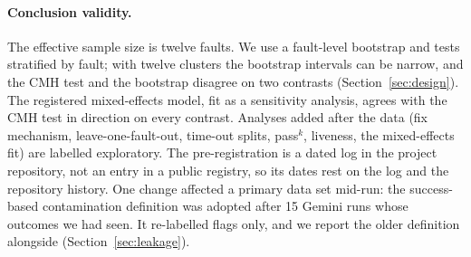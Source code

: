 \paragraph{Conclusion validity.} The effective sample size is twelve faults. We use a fault-level bootstrap and tests
stratified by fault; with twelve clusters the bootstrap intervals can be narrow, and the CMH test and the bootstrap
disagree on two contrasts (Section~\ref{sec:design}). The registered mixed-effects model, fit as a sensitivity analysis,
agrees with the CMH test in direction on every contrast. Analyses added after the data (fix mechanism, leave-one-fault-out,
time-out splits, pass$^k$, liveness, the mixed-effects fit) are labelled exploratory. The pre-registration is a dated log in
the project repository, not an entry in a public registry, so its dates rest on the log and the repository history. One
change affected a primary data set mid-run: the success-based contamination definition was adopted after 15 Gemini runs
whose outcomes we had seen. It re-labelled flags only, and we report the older definition alongside
(Section~\ref{sec:leakage}).

